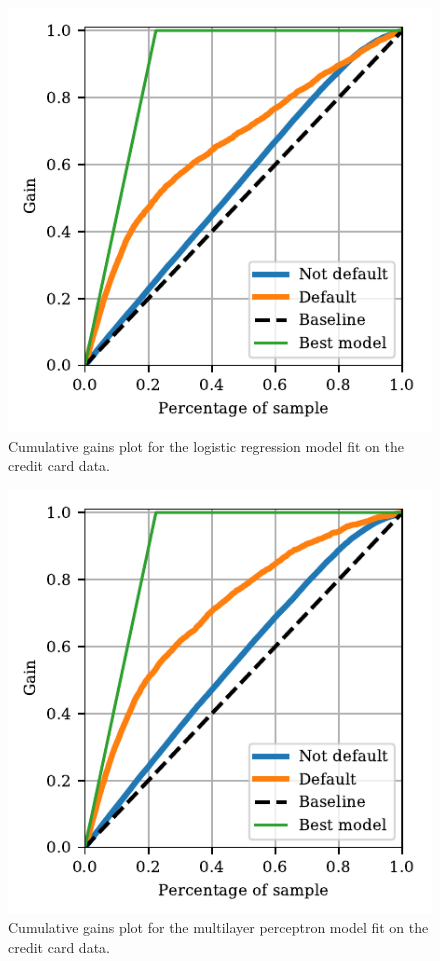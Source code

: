 \documentclass[a4paper, 11pt, twocolumn]{article}
\begin{document}
\begin{figure}[H]
	\includegraphics[scale=1]{figures/cumulative_gain_logreg.pdf}
	\caption{Cumulative gains plot for the logistic regression model fit on the 
	credit card data.}
	\label{fig:logreg_gain}
\end{figure}




\begin{figure}[H]
	\includegraphics[scale=1]{figures/cumulative_gain_NN.pdf}
	\caption{Cumulative gains plot for the multilayer perceptron model fit on 
	the credit card data.}
	\label{fig:nn_gain}
\end{figure}
\end{document}
